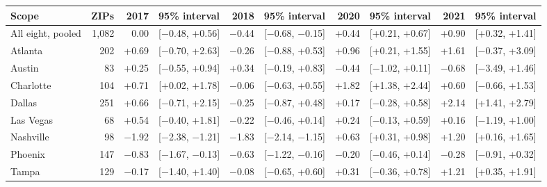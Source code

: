 \scriptsize\setlength{\tabcolsep}{1.8pt}
\begin{tabular}{lrrrrrrrrr}
\toprule
Scope & ZIPs & 2017 & 95\% interval & 2018 & 95\% interval & 2020 & 95\% interval & 2021 & 95\% interval \\
\midrule
All eight, pooled & 1,082 & 0.00 & [$-$0.48, +0.56] & $-$0.44 & [$-$0.68, $-$0.15] & +0.44 & [+0.21, +0.67] & +0.90 & [+0.32, +1.41] \\
Atlanta & 202 & +0.69 & [$-$0.70, +2.63] & $-$0.26 & [$-$0.88, +0.53] & +0.96 & [+0.21, +1.55] & +1.61 & [$-$0.37, +3.09] \\
Austin & 83 & +0.25 & [$-$0.55, +0.94] & +0.34 & [$-$0.19, +0.83] & $-$0.44 & [$-$1.02, +0.11] & $-$0.68 & [$-$3.49, +1.46] \\
Charlotte & 104 & +0.71 & [+0.02, +1.78] & $-$0.06 & [$-$0.63, +0.55] & +1.82 & [+1.38, +2.44] & +0.60 & [$-$0.66, +1.53] \\
Dallas & 251 & +0.66 & [$-$0.71, +2.15] & $-$0.25 & [$-$0.87, +0.48] & +0.17 & [$-$0.28, +0.58] & +2.14 & [+1.41, +2.79] \\
Las Vegas & 68 & +0.54 & [$-$0.40, +1.81] & $-$0.22 & [$-$0.46, +0.14] & +0.24 & [$-$0.13, +0.59] & +0.16 & [$-$1.19, +1.00] \\
Nashville & 98 & $-$1.92 & [$-$2.38, $-$1.21] & $-$1.83 & [$-$2.14, $-$1.15] & +0.63 & [+0.31, +0.98] & +1.20 & [+0.16, +1.65] \\
Phoenix & 147 & $-$0.83 & [$-$1.67, $-$0.13] & $-$0.63 & [$-$1.22, $-$0.16] & $-$0.20 & [$-$0.46, +0.14] & $-$0.28 & [$-$0.91, +0.32] \\
Tampa & 129 & $-$0.17 & [$-$1.40, +1.40] & $-$0.08 & [$-$0.65, +0.60] & +0.31 & [$-$0.36, +0.78] & +1.21 & [+0.35, +1.91] \\
\bottomrule
\end{tabular}
